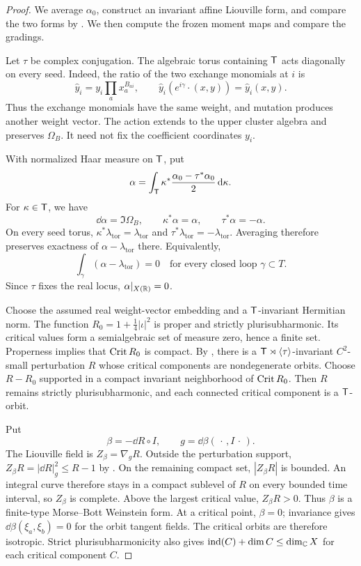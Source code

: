 \documentclass[12pt, letter]{amsart}
\theoremstyle{definition}
\numberwithin{equation}{section}
\begin{document}
\begin{proof}
We average $\alpha_0$, construct an invariant affine Liouville form,
and compare the two forms by \cite{HSinv}.
We then compute the frozen moment maps and compare the gradings.

Let $\tau$ be complex conjugation. The algebraic torus containing
$\mathsf T$ acts diagonally on every seed. Indeed, the ratio of the two
exchange monomials at $i$ is
\[
 \widehat y_i=y_i\prod_a x_a^{B_{ai}},\qquad
 \widehat y_i(e^{i\gamma}\cdot(x,y))=\widehat y_i(x,y).
\]
Thus the exchange monomials have the same weight, and mutation
produces another weight vector. The action extends to the upper
cluster algebra and preserves $\Omega_B$.
It need not fix the coefficient coordinates $y_i$.

With normalized Haar measure on $\mathsf T$, put
\[
 \alpha=\int_{\mathsf T} \kappa^*\frac{\alpha_0-\tau^*\alpha_0}{2}\,\mathrm{d}\kappa.
\]
For $\kappa\in\mathsf T$, we have
\[
 \dd\alpha=\Im\Omega_B,\qquad
 \kappa^*\alpha=\alpha,\qquad \tau^*\alpha=-\alpha.
\]
On every seed torus, $\kappa^*\lambda_{\mathrm{tor}}=
\lambda_{\mathrm{tor}}$ and
$\tau^*\lambda_{\mathrm{tor}}=-\lambda_{\mathrm{tor}}$.
Averaging therefore preserves exactness of
$\alpha-\lambda_{\mathrm{tor}}$ there. Equivalently,
\[
 \int_\gamma(\alpha-\lambda_{\mathrm{tor}})=0
 \quad\text{for every closed loop }\gamma\subset T.
\]
Since $\tau$ fixes the real locus, $\alpha|_{X(\mathbb R)}=0$.

Choose the assumed real weight-vector embedding and a
$\mathsf T$-invariant Hermitian norm. The function
$R_0=1+\frac14|\iota|^2$ is proper and strictly plurisubharmonic.
Its critical values form a semialgebraic set of measure zero,
hence a finite set. Properness implies that $\operatorname{Crit} R_0$ is compact.
By \cite[Density Lemma~4.8 and the relative remark after
Lemma~4.9]{Wasserman}, there is a
$\mathsf T\rtimes\langle\tau\rangle$-invariant $C^2$-small perturbation $R$
whose critical components are nondegenerate orbits.
Choose $R-R_0$ supported in a compact invariant neighborhood of
$\operatorname{Crit} R_0$. Then $R$ remains strictly plurisubharmonic, and each
connected critical component is a $\mathsf T$-orbit.

Put
\[
 \beta=-\dd R\circ I,\qquad
 g=\dd\beta(\,\cdot\,,I\,\cdot\,).
\]
The Liouville field is $Z_\beta=\nabla_gR$.
Outside the perturbation support,
$Z_\beta R=|\dd R|_g^2\le R-1$ by
\cite[Lemma~1.3]{HSinv}. On the remaining compact set,
$|Z_\beta R|$ is bounded.
An integral curve therefore stays in a compact sublevel of $R$
on every bounded time interval, so $Z_\beta$ is complete.
Above the largest critical value, $Z_\beta R>0$.
Thus $\beta$ is a finite-type Morse--Bott Weinstein form.
At a critical point, $\beta=0$; invariance gives
$\dd\beta(\xi_a,\xi_b)=0$ for the orbit tangent fields.
The critical orbits are therefore isotropic.
Strict plurisubharmonicity also gives
$\operatorname{ind}(C)+\dim C\le\dim_{\mathbb C}X$ for each critical component $C$.


\end{proof}
\end{document}
